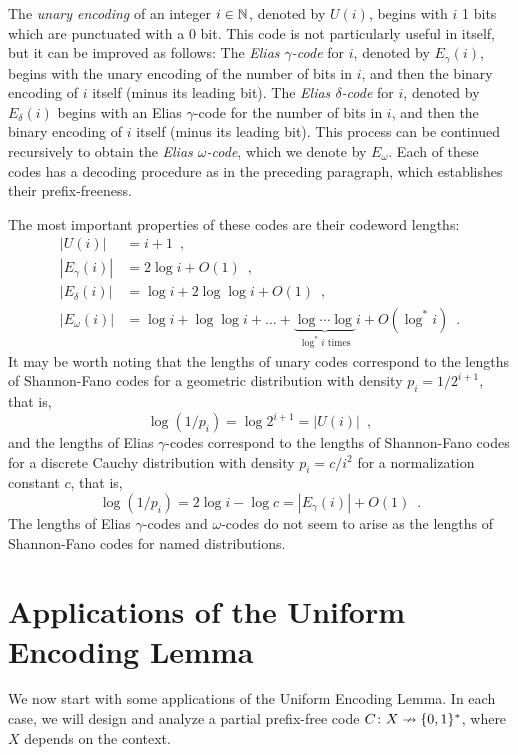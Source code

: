 \documentclass{patmorin}
\begin{document}
The \emph{unary encoding} of an integer $i \in \mathbb{N}$, denoted by $U(i)$,
begins with $i$ 1 bits which are punctuated with a 0 bit. This code is
not particularly useful in itself, but it can be improved as follows:
The \emph{Elias $\gamma$-code} for $i$, denoted by $E_\gamma(i)$,
begins with the unary encoding of the number of bits in $i$, and then
the binary encoding of $i$ itself (minus its leading bit). The
\emph{Elias $\delta$-code} for $i$, denoted by $E_\delta(i)$ begins
with an Elias $\gamma$-code for the number of bits in $i$, and then
the binary encoding of $i$ itself (minus its leading bit). This
process can be continued recursively to obtain the \emph{Elias
  $\omega$-code}, which we denote by $E_\omega$. Each of these codes
has a decoding procedure as in the preceding paragraph, which
establishes their prefix-freeness.

The most important properties of these codes are their codeword
lengths:
\begin{align*}
  |U(i)| &= i + 1 \enspace , \\
  |E_\gamma(i)| &= 2 \log i + O(1) \enspace , \\
  |E_\delta(i)| &= \log i + 2 \log \log i + O(1) \enspace , \\
  |E_\omega(i)| &= \log i + \log \log i + \dots + \underbrace{\log \cdots \log}_{\text{$\log^* i$ times}}i + O(\log^* i) \enspace .
\end{align*}
It may be worth noting that the lengths of unary codes correspond to
the lengths of Shannon-Fano codes for a geometric distribution with
density $p_i = 1/2^{i + 1}$, that is, 
\[
  \log (1/p_i) = \log 2^{i + 1} = |U(i)| \enspace ,
\]
and the lengths of Elias $\gamma$-codes correspond to the lengths of
Shannon-Fano codes for a discrete Cauchy distribution with density
$p_i = c/i^2$ for a normalization constant $c$, that is,
\[
  \log (1/p_i) = 2 \log i - \log c = |E_\gamma(i)| + O(1) \enspace .
\]
The lengths of Elias $\gamma$-codes and $\omega$-codes do not seem to
arise as the lengths of Shannon-Fano codes for named distributions.

\section{Applications of the Uniform Encoding Lemma}

We now start with some applications of the Uniform Encoding Lemma. In
each case, we will design and analyze a partial prefix-free code
$C\colon X\nrightarrow \{0, 1\}^*$, where $X$ depends on
the context.
\end{document}

